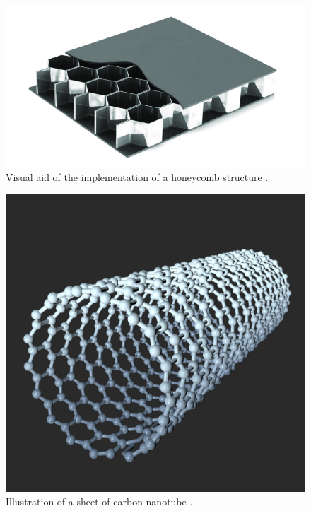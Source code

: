 \documentclass[12pt]{article}
\begin{document}
\begin{figure}[H]
\centering
\includegraphics[scale=0.5]{Media/Document/Honeycomb-structure-Honeycomb-structures-are-highly-laborious-in-manufacturing-and.png}
\caption{Visual aid of the implementation of a honeycomb structure \cite{HoneycombPic}.}
\label{Honeycomb Image}
\end{figure}

\begin{figure}[H]
\centering
\includegraphics[scale=0.15]{Media/Document/Illustration-carbon-nanotube.jpg}
\caption{Illustration of a sheet of carbon nanotube \cite{CarbonNano}.}
\label{Carbon Nanotube image}
\end{figure}
\end{document}

